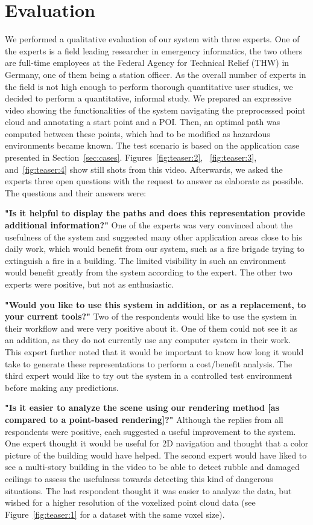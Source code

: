 \section{Evaluation} \label{sec:evaluation}
We performed a qualitative evaluation of our system with three experts. One of the experts is a field leading researcher in emergency informatics, the two others are full-time employees at the Federal Agency for Technical Relief (THW) in Germany, one of them being a station officer. As the overall number of experts in the field is not high enough to perform thorough quantitative user studies, we decided to perform a quantitative, informal study. We prepared an expressive video showing the functionalities of the system navigating the preprocessed point cloud and annotating a start point and a POI. Then, an optimal path was computed between these points, which had to be modified as hazardous environments became known. The test scenario is based on the application case presented in Section~\ref{sec:cases}. Figures~\ref{fig:teaser:2}, ~\ref{fig:teaser:3}, and~\ref{fig:teaser:4} show still shots from this video. Afterwards, we asked the experts three open questions with the request to answer as elaborate as possible. The questions and their answers were:

\noindent \textbf{"Is it helpful to display the paths and does this representation provide additional information?"} One of the experts was very convinced about the usefulness of the system and suggested many other application areas close to his daily work, which would benefit from our system, such as a fire brigade trying to extinguish a fire in a building. The limited visibility in such an environment would benefit greatly from the system according to the expert. The other two experts were positive, but not as enthusiastic.

\noindent \textbf{"Would you like to use this system in addition, or as a replacement, to your current tools?"} Two of the respondents would like to use the system in their workflow and were very positive about it. One of them could not see it as an addition, as they do not currently use any computer system in their work. This expert further noted that it would be important to know how long it would take to generate these representations to perform a cost/benefit analysis. The third expert would like to try out the system in a controlled test environment before making any predictions.

\noindent \textbf{"Is it easier to analyze the scene using our rendering method [as compared to a point-based rendering]?"} Although the replies from all respondents were positive, each suggested a useful improvement to the system. One expert thought it would be useful for 2D navigation and thought that a color picture of the building would have helped. The second expert would have liked to see a multi-story building in the video to be able to detect rubble and damaged ceilings to assess the usefulness towards detecting this kind of dangerous situations. The last respondent thought it was easier to analyze the data, but wished for a higher resolution of the voxelized point cloud data (see Figure~\ref{fig:teaser:1} for a dataset with the same voxel size).


